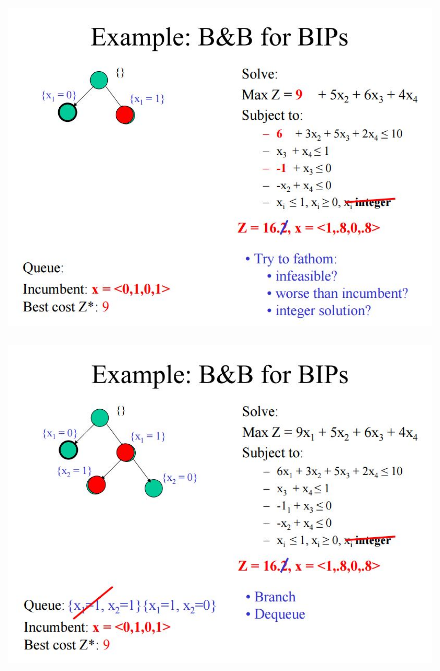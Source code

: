 \documentclass{beamer}
\begin{document}
\begin{frame}
	\begin{figure}
		\centering
		\includegraphics[width=1.0\linewidth]{BB-BIP/BB-BIP15}
	\end{figure}
\end{frame}
\begin{frame}
	\begin{figure}
		\centering
		\includegraphics[width=1.1\linewidth]{BB-BIP/BB-BIP16}
	\end{figure}
\end{frame}
\end{document}
